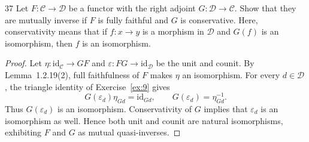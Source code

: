 \begin{exercise}{37}
Let $F\colon\mathcal C\to\mathcal D$ be a functor with the right adjoint
$G\colon\mathcal D\to\mathcal C$. Show that they are mutually inverse if $F$ is fully faithful
and $G$ is conservative. Here, conservativity means that if $f\colon x\to y$ is a morphism
in $\mathcal D$ and $G(f)$ is an isomorphism, then $f$ is an isomorphism.

\begin{proof}
Let $\eta\colon\mathrm{id}_{\mathcal C}\to GF$ and
$\varepsilon\colon FG\to\mathrm{id}_{\mathcal D}$ be the unit
and counit. By Lemma~1.2.19(2), full faithfulness of $F$ makes
$\eta$ an isomorphism. For every $d\in\mathcal D$, the triangle
identity of Exercise~\ref{ex:9} gives
\[
 G(\varepsilon_d)\eta_{Gd}=\mathrm{id}_{Gd},
 \qquad G(\varepsilon_d)=\eta_{Gd}^{-1}.
\]
Thus $G(\varepsilon_d)$ is an isomorphism. Conservativity of
$G$ implies that $\varepsilon_d$ is an isomorphism as well.
Hence both unit and counit are natural isomorphisms, exhibiting
$F$ and $G$ as mutual quasi-inverses.
\end{proof}
\end{exercise}
